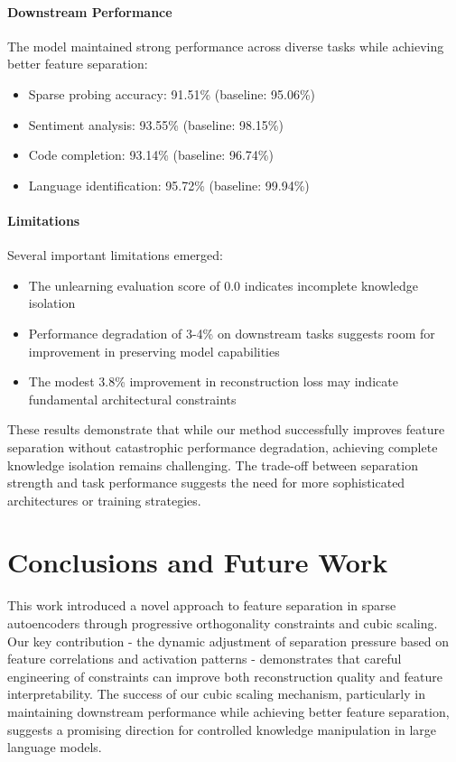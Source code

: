 \documentclass{article} %
\begin{document}
\paragraph{Downstream Performance} The model maintained strong performance across diverse tasks while achieving better feature separation:

\begin{itemize}
    \item Sparse probing accuracy: 91.51\% (baseline: 95.06\%)
    \item Sentiment analysis: 93.55\% (baseline: 98.15\%)
    \item Code completion: 93.14\% (baseline: 96.74\%)
    \item Language identification: 95.72\% (baseline: 99.94\%)
\end{itemize}

\paragraph{Limitations} Several important limitations emerged:

\begin{itemize}
    \item The unlearning evaluation score of 0.0 indicates incomplete knowledge isolation
    \item Performance degradation of 3-4\% on downstream tasks suggests room for improvement in preserving model capabilities
    \item The modest 3.8\% improvement in reconstruction loss may indicate fundamental architectural constraints
\end{itemize}

These results demonstrate that while our method successfully improves feature separation without catastrophic performance degradation, achieving complete knowledge isolation remains challenging. The trade-off between separation strength and task performance suggests the need for more sophisticated architectures or training strategies.

\section{Conclusions and Future Work}
\label{sec:conclusion}

This work introduced a novel approach to feature separation in sparse autoencoders through progressive orthogonality constraints and cubic scaling. Our key contribution - the dynamic adjustment of separation pressure based on feature correlations and activation patterns - demonstrates that careful engineering of constraints can improve both reconstruction quality and feature interpretability. The success of our cubic scaling mechanism, particularly in maintaining downstream performance while achieving better feature separation, suggests a promising direction for controlled knowledge manipulation in large language models.
\end{document}
